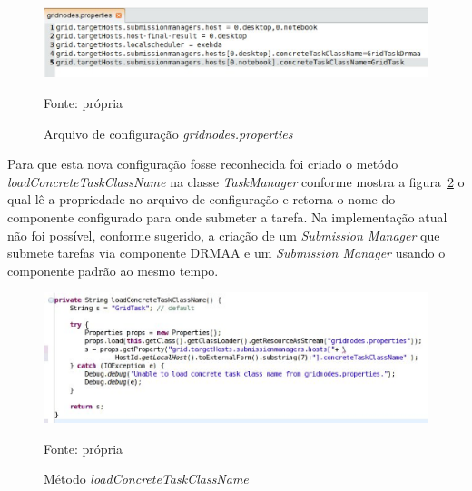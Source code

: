 \begin{figure}[htb]
\begin{center}
\includegraphics[scale=0.5]{./img/gridnodes_properties.eps}
\caption{Arquivo de configuração \emph{gridnodes.properties}}
\label{fig:gridonodes_properties}
Fonte: própria
\end{center}
\end{figure}

Para que esta nova configuração fosse reconhecida foi criado o metódo \emph{loadConcreteTaskClassName} na classe \emph{TaskManager} conforme mostra a figura~\ref{fig:Concrete} o qual lê a propriedade no arquivo de configuração e retorna o nome do componente configurado para onde submeter a tarefa. Na implementação atual não foi possível, conforme sugerido, a criação de um \emph{Submission Manager} que submete tarefas via componente DRMAA e um \emph{Submission Manager} usando o componente padrão ao mesmo tempo.

\begin{figure}[htb]
\begin{center}
\includegraphics[scale=0.7]{./img/concrete.eps}
\caption{Método \emph{loadConcreteTaskClassName}}
\label{fig:Concrete}
Fonte: própria
\end{center}
\end{figure}